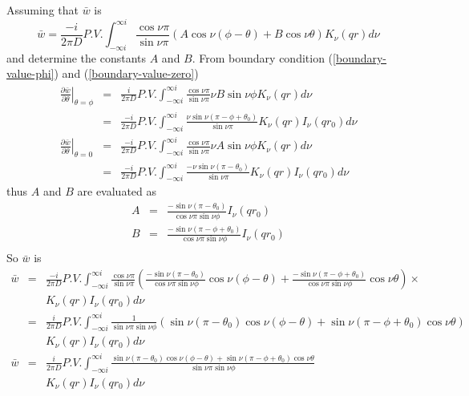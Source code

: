 \documentclass{article}
\begin{document}
Assuming that $\bar{w}$ is
\begin{equation}
    \bar{w}
  = \frac{-i}{2\pi D}P.V.\int^{\infty i}_{-\infty i}
    \frac{\cos\nu\pi}{\sin\nu\pi}
    (A\cos\nu(\phi - \theta) + B\cos\nu\theta)
    K_\nu(qr)d\nu
\end{equation}
and determine the constants $A$ and $B$. From boundary condition
(\ref{boundary-value-phi}) and (\ref{boundary-value-zero})
\begin{eqnarray}
%
%
    \left.\frac{\partial\bar{w}}{\partial\theta}\right|_{\theta = \phi}
    &=& \frac{i}{2\pi D}P.V.\int^{\infty i}_{-\infty i}
    \frac{\cos\nu\pi}{\sin\nu\pi}
    \nu B\sin\nu\phi
    K_\nu(qr)d\nu \nonumber \\
    &=& \frac{-i}{2\pi D}P.V.\int^{\infty i}_{-\infty i}
        \frac{\nu\sin\nu(\pi - \phi + \theta_0)}{\sin\nu\pi}
        K_\nu(qr)I_\nu(qr_0)d\nu \nonumber \\
%
%
    \left.\frac{\partial\bar{w}}{\partial\theta}\right|_{\theta = 0}
    &=& \frac{-i}{2\pi D}P.V.\int^{\infty i}_{-\infty i}
    \frac{\cos\nu\pi}{\sin\nu\pi}
    \nu A\sin\nu\phi
    K_\nu(qr)d\nu \nonumber \\
    &=& \frac{-i}{2\pi D}P.V.\int^{\infty i}_{-\infty i}
        \frac{-\nu\sin\nu(\pi - \theta_0)}{\sin\nu\pi}
        K_\nu(qr)I_\nu(qr_0)d\nu
\end{eqnarray}
thus $A$ and $B$ are evaluated as
\begin{eqnarray}
    A &=& \frac{-\sin\nu(\pi - \theta_0)}{\cos\nu\pi\sin\nu\phi}I_\nu(qr_0) \nonumber \\
    B &=& \frac{-\sin\nu(\pi-\phi+\theta_0)}{\cos\nu\pi\sin\nu\phi}I_\nu(qr_0) \nonumber \\
\end{eqnarray}
So $\bar{w}$ is
\begin{eqnarray}
    \bar{w} &=& \frac{-i}{2\pi D}P.V.\int^{\infty i}_{-\infty i}
                \frac{\cos\nu\pi}{\sin\nu\pi}
                \left(\frac{-\sin\nu(\pi - \theta_0)}{\cos\nu\pi\sin\nu\phi}\cos\nu(\phi - \theta) +
                      \frac{-\sin\nu(\pi-\phi+\theta_0)}{\cos\nu\pi\sin\nu\phi}\cos\nu\theta\right)\times\nonumber \\
            & & K_\nu(qr)I_\nu(qr_0)d\nu \nonumber \\
            &=& \frac{i}{2\pi D}P.V.\int^{\infty i}_{-\infty i}
                \frac{1}{\sin\nu\pi\sin\nu\phi}
                \left(\sin\nu(\pi - \theta_0)\cos\nu(\phi - \theta) +
                      \sin\nu(\pi-\phi+\theta_0)\cos\nu\theta\right)\nonumber \\
            & & K_\nu(qr)I_\nu(qr_0)d\nu \nonumber \\
    \bar{w} &=& \frac{i}{2\pi D}P.V.\int^{\infty i}_{-\infty i}
                \frac{\sin\nu(\pi - \theta_0)\cos\nu(\phi - \theta) +
                      \sin\nu(\pi-\phi+\theta_0)\cos\nu\theta}
                {\sin\nu\pi\sin\nu\phi}\nonumber \\
            & & K_\nu(qr)I_\nu(qr_0)d\nu\label{bar-w}
\end{eqnarray}
\end{document}
